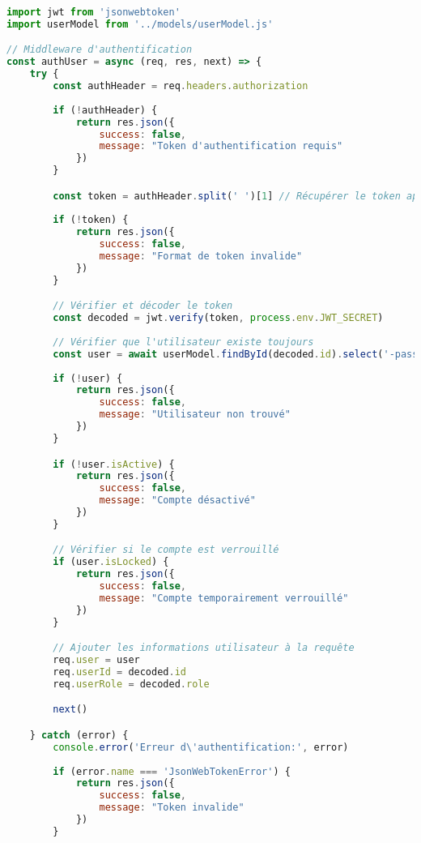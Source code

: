 \begin{lstlisting}[language=JavaScript, caption=authMiddleware.js - Vérification des tokens JWT]
import jwt from 'jsonwebtoken'
import userModel from '../models/userModel.js'

// Middleware d'authentification
const authUser = async (req, res, next) => {
    try {
        const authHeader = req.headers.authorization
        
        if (!authHeader) {
            return res.json({ 
                success: false, 
                message: "Token d'authentification requis" 
            })
        }

        const token = authHeader.split(' ')[1] // Récupérer le token après "Bearer "
        
        if (!token) {
            return res.json({ 
                success: false, 
                message: "Format de token invalide" 
            })
        }

        // Vérifier et décoder le token
        const decoded = jwt.verify(token, process.env.JWT_SECRET)
        
        // Vérifier que l'utilisateur existe toujours
        const user = await userModel.findById(decoded.id).select('-password')
        
        if (!user) {
            return res.json({ 
                success: false, 
                message: "Utilisateur non trouvé" 
            })
        }

        if (!user.isActive) {
            return res.json({ 
                success: false, 
                message: "Compte désactivé" 
            })
        }

        // Vérifier si le compte est verrouillé
        if (user.isLocked) {
            return res.json({ 
                success: false, 
                message: "Compte temporairement verrouillé" 
            })
        }

        // Ajouter les informations utilisateur à la requête
        req.user = user
        req.userId = decoded.id
        req.userRole = decoded.role

        next()

    } catch (error) {
        console.error('Erreur d\'authentification:', error)
        
        if (error.name === 'JsonWebTokenError') {
            return res.json({ 
                success: false, 
                message: "Token invalide" 
            })
        }
        

\end{lstlisting}
